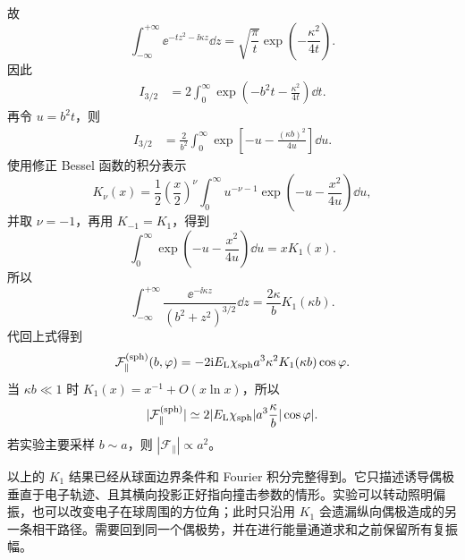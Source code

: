 故
\begin{equation}
\int_{-\infty}^{+\infty}
\ee^{-tz^2-\ii\kappa z}\dd z
=\sqrt{\frac{\pi}{t}}
\exp\!\left(-\frac{\kappa^2}{4t}\right).
\end{equation}
因此
\begin{align}
I_{3/2}
&=2\int_0^{\infty}
\exp\!\left(-b^2t-\frac{\kappa^2}{4t}\right)\dd t.
\end{align}
再令 $u=b^2t$，则
\begin{align}
I_{3/2}
&=\frac{2}{b^2}
\int_0^{\infty}
\exp\!\left[-u-\frac{(\kappa b)^2}{4u}\right]\dd u.
\end{align}
使用修正 Bessel 函数的积分表示
\begin{equation}
K_\nu(x)
=\frac12\left(\frac{x}{2}\right)^\nu
\int_0^{\infty}u^{-\nu-1}
\exp\!\left(-u-\frac{x^2}{4u}\right)\dd u,
\end{equation}
并取 $\nu=-1$，再用 $K_{-1}=K_1$，得到
\begin{equation}
\int_0^{\infty}
\exp\!\left(-u-\frac{x^2}{4u}\right)\dd u
=xK_1(x).
\end{equation}
所以
\begin{equation}
{
\int_{-\infty}^{+\infty}
\frac{\ee^{-\ii\kappa z}}{(b^2+z^2)^{3/2}}\dd z
=\frac{2\kappa}{b}K_1(\kappa b).}
\label{eq:K1-trajectory-transform}
\end{equation}
代回上式得到
\begin{equation}
{
\mathcal F_{\parallel}^{(\rm sph)}(b,\varphi)
=-2\mathrm{i}E_{\rm L}\chi_{\rm sph}a^3
\kappa^2K_1(\kappa b)\cos\varphi.}
\label{eq:F-sphere-general}
\end{equation}
当 $\kappa b\ll1$ 时 $K_1(x)=x^{-1}+O(x\ln x)$，所以
\begin{equation}
|\mathcal F_{\parallel}^{(\rm sph)}|
\simeq
2|E_{\rm L}\chi_{\rm sph}|a^3
\frac{\kappa}{b}|\cos\varphi|.
\label{eq:F-sphere-small-kappa}
\end{equation}
若实验主要采样 $b\sim a$，则 $|\mathcal F_{\parallel}|\propto a^2$。


以上的 $K_1$ 结果已经从球面边界条件和 Fourier 积分完整得到。它只描述诱导偶极垂直于电子轨迹、且其横向投影正好指向撞击参数的情形。实验可以转动照明偏振，也可以改变电子在球周围的方位角；此时只沿用 $K_1$ 会遗漏纵向偶极造成的另一条相干路径。需要回到同一个偶极势，并在进行能量通道求和之前保留所有复振幅。

